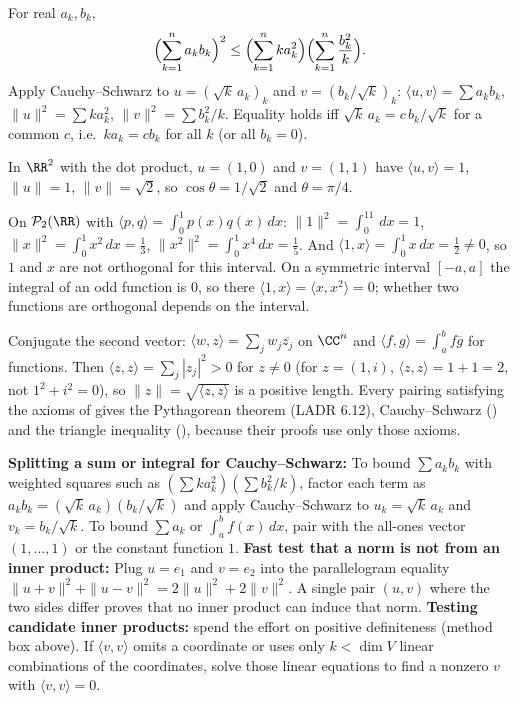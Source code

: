 \documentclass[10pt]{scrartcl}
\newcommand{\ip}[2]{\langle #1,#2\rangle}
\begin{document}
\begin{example*}
  For real $a_k,b_k$,
  \[ \Bigl(\sum_{k=1}^na_kb_k\Bigr)^2\le\Bigl(\sum_{k=1}^nka_k^2\Bigr)\Bigl(\sum_{k=1}^n\frac{b_k^2}k\Bigr). \]
  Apply Cauchy--Schwarz to $u=(\sqrt k\,a_k)_k$ and $v=(b_k/\sqrt k)_k$: $\ip uv=\sum a_kb_k$, $\|u\|^2=\sum ka_k^2$, $\|v\|^2=\sum b_k^2/k$. Equality holds iff $\sqrt k\,a_k=c\,b_k/\sqrt k$ for a common $c$, i.e.\ $ka_k=cb_k$ for all $k$ (or all $b_k=0$).
\end{example*}

\begin{example*}[An angle (Ex.~68)]
  In $\RR^2$ with the dot product, $u=(1,0)$ and $v=(1,1)$ have $\ip uv=1$, $\|u\|=1$, $\|v\|=\sqrt2$, so $\cos\theta=1/\sqrt2$ and $\theta=\pi/4$.
\end{example*}

\begin{example*}
  On $\PP_2(\RR)$ with $\ip pq=\int_0^1p(x)q(x)\,dx$: $\|1\|^2=\int_0^11\,dx=1$, $\|x\|^2=\int_0^1x^2\,dx=\frac13$, $\|x^2\|^2=\int_0^1x^4\,dx=\frac15$. And $\ip1x=\int_0^1x\,dx=\frac12\ne0$, so $1$ and $x$ are not orthogonal for this interval. On a symmetric interval $[-a,a]$ the integral of an odd function is $0$, so there $\ip1x=\ip{x}{x^2}=0$; whether two functions are orthogonal depends on the interval.
\end{example*}

\revisit Conjugate the second vector: $\ip wz=\sum_jw_j\overline{z_j}$ on $\CC^n$ and $\ip fg=\int_a^bf\overline g$ for functions. Then $\ip zz=\sum_j|z_j|^2>0$ for $z\ne0$ (for $z=(1,i)$, $\ip zz=1+1=2$, not $1^2+i^2=0$), so $\|z\|=\sqrt{\ip zz}$ is a positive length. Every pairing satisfying the axioms of  gives the Pythagorean theorem (LADR 6.12), Cauchy--Schwarz () and the triangle inequality (), because their proofs use only those axioms.

\begin{shortcuts}
  \ii \textbf{Splitting a sum or integral for Cauchy--Schwarz:} To bound $\sum a_kb_k$ with weighted squares such as $(\sum k a_k^2)(\sum b_k^2/k)$, factor each term as $a_kb_k=(\sqrt{k}\,a_k)(b_k/\sqrt{k})$ and apply Cauchy--Schwarz to $u_k=\sqrt{k}\,a_k$ and $v_k=b_k/\sqrt{k}$. To bound $\sum a_k$ or $\int_a^b f(x)\,dx$, pair with the all-ones vector $(1,\dots,1)$ or the constant function $1$.
  \ii \textbf{Fast test that a norm is not from an inner product:} Plug $u=e_1$ and $v=e_2$ into the parallelogram equality $\|u+v\|^2+\|u-v\|^2=2\|u\|^2+2\|v\|^2$. A single pair $(u,v)$ where the two sides differ proves that no inner product can induce that norm.
  \ii \textbf{Testing candidate inner products:} spend the effort on positive definiteness (method box above). If $\ip vv$ omits a coordinate or uses only $k<\dim V$ linear combinations of the coordinates, solve those linear equations to find a nonzero $v$ with $\ip vv=0$.
\end{shortcuts}
\end{document}
